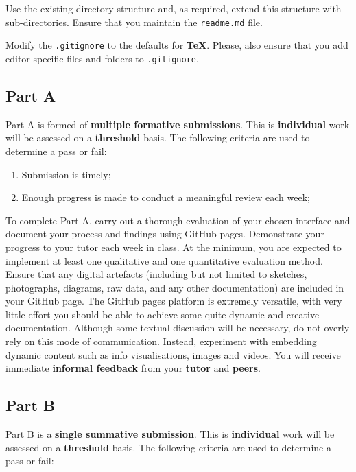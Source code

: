 \documentclass{../fal_assignment}
\begin{document}
Use the existing directory structure and, as required, extend this structure with sub-directories. Ensure that you maintain the \texttt{readme.md} file.

Modify the \texttt{.gitignore} to the defaults for \textbf{TeX}. Please, also ensure that you add editor-specific files and folders to \texttt{.gitignore}. 

\subsection*{Part A}

Part A is formed of \textbf{multiple formative submissions}. This is \textbf{individual} work will be assessed on a \textbf{threshold} basis. The following criteria are used to determine a pass or fail:

\begin{enumerate}[label=(\alph*)]
	\item Submission is timely;
	\item Enough progress is made to conduct a meaningful review each week;
\end{enumerate}

To complete Part A, carry out a thorough evaluation of your chosen interface and document your process and findings using GitHub pages.  Demonstrate your progress to your tutor each week in class. At the minimum, you are expected to implement at least one qualitative and one quantitative evaluation method. Ensure that any digital artefacts (including but not limited to sketches, photographs, diagrams, raw data, and any other documentation) are included in your GitHub page. The GitHub pages platform is extremely versatile, with very little effort you should be able to achieve some quite dynamic and creative documentation. Although some textual discussion will be necessary, do not overly rely on this mode of communication. Instead, experiment with embedding dynamic content such as info visualisations, images and videos. You will receive immediate \textbf{informal feedback} from your \textbf{tutor} and \textbf{peers}.

\subsection*{Part B}

Part B is a \textbf{single summative submission}. This is \textbf{individual} work will be assessed on a \textbf{threshold} basis. The following criteria are used to determine a pass or fail: 
\end{document}
